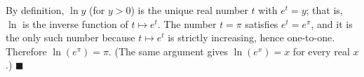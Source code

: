 By definition, $\ln y$ (for $y>0$) is the unique real number $t$ with $e^t=y$; that is, $\ln$ is the inverse function of $t\mapsto e^t$. The number $t=\pi$ satisfies $e^t=e^{\pi}$, and it is the only such number because $t\mapsto e^t$ is strictly increasing, hence one-to-one. Therefore $\ln\left(e^{\pi}\right)=\pi$. (The same argument gives $\ln\left(e^x\right)=x$ for every real $x$.) $\blacksquare$
